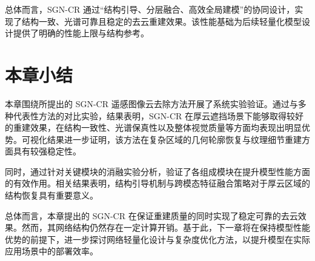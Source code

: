总体而言，SGN-CR 通过“结构引导、分层融合、高效全局建模”的协同设计，实现了结构一致、光谱可靠且稳定的去云重建效果。该性能基础为后续轻量化模型设计提供了明确的性能上限与结构参考。

\section{本章小结}

本章围绕所提出的 SGN-CR 遥感图像云去除方法开展了系统实验验证。通过与多种代表性方法的对比实验，结果表明，SGN-CR 在厚云遮挡场景下能够取得较好的重建效果，在结构一致性、光谱保真性以及整体视觉质量等方面均表现出明显优势。可视化结果进一步证明，该方法在复杂区域的几何轮廓恢复与纹理细节重建方面具有较强稳定性。

同时，通过针对关键模块的消融实验分析，验证了各组成模块在提升模型性能方面的有效作用。相关结果表明，结构引导机制与跨模态特征融合策略对于厚云区域的结构恢复具有重要意义。

总体而言，本章提出的 SGN-CR 在保证重建质量的同时实现了稳定可靠的去云效果。然而，其网络结构仍然存在一定计算开销。基于此，下一章将在保持模型性能优势的前提下，进一步探讨网络轻量化设计与复杂度优化方法，以提升模型在实际应用场景中的部署效率。
